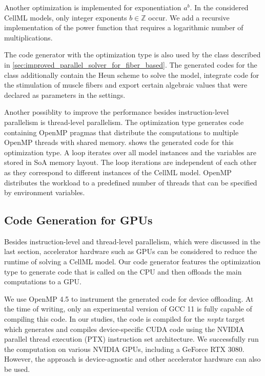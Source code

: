 Another optimization is implemented for exponentiation $a^b$. In the considered CellML models, only integer exponents $b\in \mathbb{Z}$ occur. We add a recursive implementation of the power function that requires a logarithmic number of multiplications. 

The code generator with the  optimization type is also used by the  class described in \cref{sec:improved_parallel_solver_for_fiber_based}. The generated codes for the  class additionally contain the Heun scheme to solve the model, integrate code for the stimulation of muscle fibers and  export certain algebraic values that were declared as parameters in the settings.

Another possiblity to improve the performance besides instruction-level parallelism is thread-level parallelism. The  optimization type generates code containing OpenMP pragmas that distribute the computations to multiple OpenMP threads with shared memory.  shows the generated code for this optimization type. A loop iterates over all model instances and the variables are stored in SoA memory layout. The loop iterations are independent of each other as they correspond to different instances of the CellML model. OpenMP distributes the workload to a predefined number of threads that can be specified by environment variables.

\subsection{Code Generation for GPUs}

Besides instruction-level and thread-level parallelism, which were discussed in the last section, accelerator hardware such as GPUs can be considered to reduce the runtime of solving a CellML model.
Our code generator features the  optimization type to generate code that is called on the CPU and then offloads the main computations to a GPU.

We use OpenMP 4.5 to instrument the generated code for device offloading. At the time of writing, only an experimental version of GCC 11 is fully capable of compiling this code. In our studies, the code is compiled for the \emph{nvptx} target which generates and compiles device-specific CUDA code using the NVIDIA parallel thread execution (PTX) instruction set architecture. We successfully run the computation on various NVIDIA GPUs, including a GeForce RTX 3080. However, the approach is device-agnostic and other accelerator hardware can also be used.

